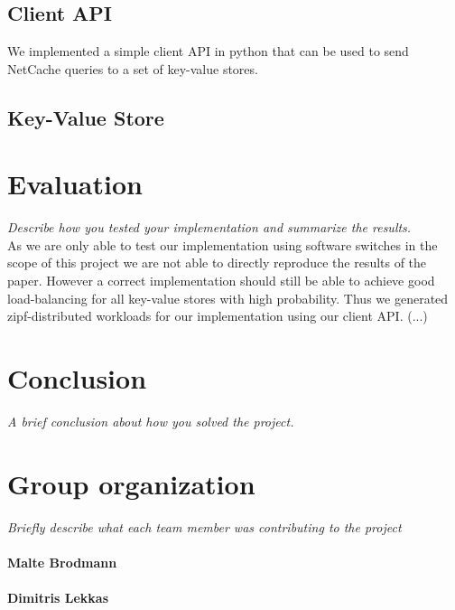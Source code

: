 \documentclass[11pt,oneside,a4paper]{article}
\newcommand{\hint}[1]{{\color{blue} \em #1}}
\begin{document}
\subsection{Client API}

We implemented a simple client API in python that can be used to send NetCache queries to a set of key-value stores.

\subsection{Key-Value Store}

\section{Evaluation}
\hint{Describe how you tested your implementation and summarize the results.} \\
As we are only able to test our implementation using software switches in the scope of this project we are not able to directly reproduce the results of the paper.
However a correct implementation should still be able to achieve good load-balancing  for all key-value stores with high probability.
Thus we generated zipf-distributed workloads for our implementation using our client API.
(...)

\section{Conclusion}
\hint{A brief conclusion about how you solved the project.} \\
\lipsum[1]

\label{lastpage} %
\clearpage
{}



\clearpage
\appendix
{}

\section{Group organization}
\hint{Briefly describe what each team member was contributing to the project}

\paragraph{Malte Brodmann}
\lipsum[2]

\paragraph{Dimitris Lekkas}
\lipsum[3]
\end{document}
